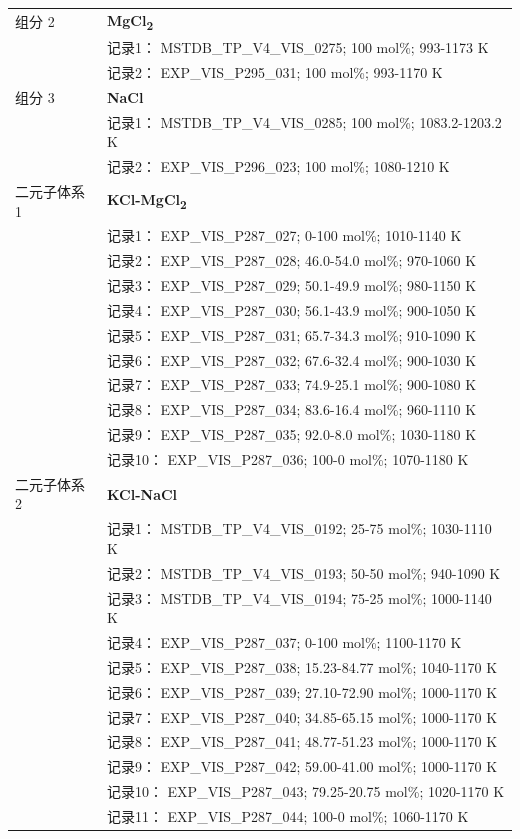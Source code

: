 \documentclass[12pt]{article}
\begin{document}
{\begin{longtable}[]{@{}
  >{\raggedright\arraybackslash}p{}
  >{\raggedright\arraybackslash}p{}@{}}
组分 2  & \textbf{MgCl\textsubscript{2}} \\
 & 记录1： MSTDB\_TP\_V4\_VIS\_0275; 100 mol\%; 993-1173 K \\
 & 记录2： EXP\_VIS\_P295\_031; 100 mol\%; 993-1170 K  \\

组分 3  & \textbf{NaCl} \\
 & 记录1： MSTDB\_TP\_V4\_VIS\_0285; 100 mol\%; 1083.2-1203.2 K \\
 & 记录2： EXP\_VIS\_P296\_023; 100 mol\%; 1080-1210 K  \\

二元子体系 1  & \textbf{KCl-MgCl\textsubscript{2}} \\
 & 记录1： EXP\_VIS\_P287\_027; 0-100 mol\%; 1010-1140 K \\
 & 记录2： EXP\_VIS\_P287\_028; 46.0-54.0 mol\%; 970-1060 K \\
 & 记录3： EXP\_VIS\_P287\_029; 50.1-49.9 mol\%; 980-1150 K \\
 & 记录4： EXP\_VIS\_P287\_030; 56.1-43.9 mol\%; 900-1050 K \\
 & 记录5： EXP\_VIS\_P287\_031; 65.7-34.3 mol\%; 910-1090 K \\
 & 记录6： EXP\_VIS\_P287\_032; 67.6-32.4 mol\%; 900-1030 K \\
 & 记录7： EXP\_VIS\_P287\_033; 74.9-25.1 mol\%; 900-1080 K \\
 & 记录8： EXP\_VIS\_P287\_034; 83.6-16.4 mol\%; 960-1110 K \\
 & 记录9： EXP\_VIS\_P287\_035; 92.0-8.0 mol\%; 1030-1180 K \\
 & 记录10： EXP\_VIS\_P287\_036; 100-0 mol\%; 1070-1180 K  \\

二元子体系 2  & \textbf{KCl-NaCl} \\
 & 记录1： MSTDB\_TP\_V4\_VIS\_0192; 25-75 mol\%; 1030-1110 K \\
 & 记录2： MSTDB\_TP\_V4\_VIS\_0193; 50-50 mol\%; 940-1090 K \\
 & 记录3： MSTDB\_TP\_V4\_VIS\_0194; 75-25 mol\%; 1000-1140 K \\
 & 记录4： EXP\_VIS\_P287\_037; 0-100 mol\%; 1100-1170 K \\
 & 记录5： EXP\_VIS\_P287\_038; 15.23-84.77 mol\%; 1040-1170 K \\
 & 记录6： EXP\_VIS\_P287\_039; 27.10-72.90 mol\%; 1000-1170 K \\
 & 记录7： EXP\_VIS\_P287\_040; 34.85-65.15 mol\%; 1000-1170 K \\
 & 记录8： EXP\_VIS\_P287\_041; 48.77-51.23 mol\%; 1000-1170 K \\
 & 记录9： EXP\_VIS\_P287\_042; 59.00-41.00 mol\%; 1000-1170 K \\
 & 记录10： EXP\_VIS\_P287\_043; 79.25-20.75 mol\%; 1020-1170 K \\
 & 记录11： EXP\_VIS\_P287\_044; 100-0 mol\%; 1060-1170 K  \\


\end{longtable}}
\end{document}
